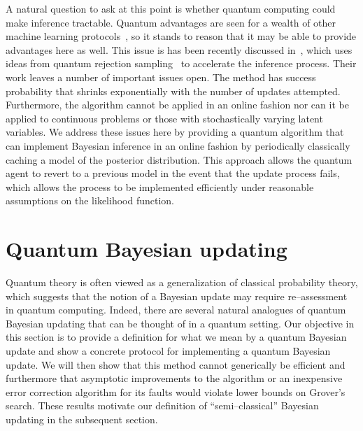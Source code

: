 \documentclass[aps,amsmath,onecolumn,amssymb,notitlepage]{revtex4-1}
\begin{document}
 A natural question to ask at this point is whether quantum computing could make inference tractable.  Quantum advantages are seen for a wealth of other machine learning protocols~\cite{aimeur2006machine,wiebe_quantum_2014,wiebe2014quantum,lloyd2013quantum,lloyd2014quantum,boixo2015fast}, so it stands to reason that it may be able to provide advantages here as well.  This issue is has been recently discussed in~\cite{LYC14}, which uses ideas from quantum rejection sampling~\cite{HHL09,ORR13} to accelerate the inference process.  Their work leaves a number of important issues open.  The method has success probability that shrinks exponentially with the number of updates attempted.  Furthermore, the algorithm cannot be applied in an online fashion nor can it be applied to continuous problems or those with stochastically varying latent variables.  We address these issues here by providing a quantum algorithm that can implement Bayesian inference in an online fashion by periodically classically caching a model of the posterior distribution.  This approach allows the quantum agent to revert to a previous model in the event that the update process fails, which allows the process to be implemented efficiently under reasonable assumptions on the likelihood function.




\section{Quantum Bayesian updating}
Quantum theory is often viewed as a generalization of classical probability theory, which suggests that the notion of a Bayesian update may require re--assessment in quantum computing.  Indeed, there are several natural analogues of quantum Bayesian updating that can be thought of in a quantum setting.
Our objective in this section is to provide a definition for what we mean by a quantum Bayesian update and show a concrete protocol for implementing a quantum Bayesian update.  We will then show that this method cannot generically be efficient and furthermore that asymptotic improvements to the algorithm or an inexpensive error correction algorithm for its faults would violate lower bounds on Grover's search.  These results motivate our definition of ``semi--classical'' Bayesian updating in the subsequent section.
\end{document}
